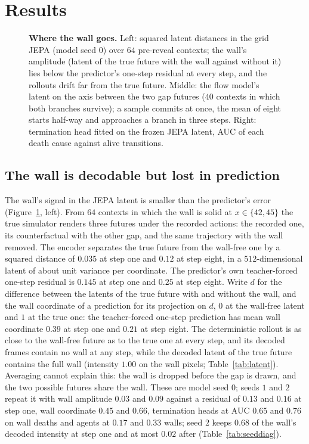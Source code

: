 \section{Results}
\label{sec:results}

\begin{figure}[t]
\centering
{}
\caption{\textbf{Where the wall goes.} Left: squared latent distances in the grid JEPA (model seed $0$) over $64$ pre-reveal contexts; the wall's amplitude (latent of the true future with the wall against without it)
lies below the predictor's one-step residual at every step, and the rollouts drift far from the true
future. Middle: the flow model's latent on the axis between the two gap futures ($40$ contexts in which both branches survive); a sample commits at once, the mean of eight starts half-way and approaches a branch in three steps. Right: termination head fitted on the frozen JEPA latent, AUC of each death cause against alive transitions.}
\label{fig:geometry}
\end{figure}

\subsection{The wall is decodable but lost in prediction}
\label{sec:results-wall}

The wall's signal in the JEPA latent is smaller than the predictor's error
(Figure~\ref{fig:geometry}, left). From $64$ contexts in which the wall is solid at $x\in\{42,45\}$ the
true simulator renders three futures under the recorded actions: the recorded one, its counterfactual
with the other gap, and the same trajectory with the wall removed. The encoder separates
the true future from the wall-free one by a squared distance of $0.035$ at step one and $0.12$ at
step eight, in a $512$-dimensional latent of about unit variance per coordinate. The predictor's own teacher-forced one-step residual is
$0.145$ at step one and $0.25$ at step eight. Write $d$ for the difference between the latents of the
true future with and without the wall, and the wall coordinate of a prediction for its projection on
$d$, $0$ at the wall-free latent and $1$ at the true one: the teacher-forced one-step prediction has
mean wall coordinate $0.39$ at step one and $0.21$ at step eight. The deterministic rollout is as close to the
wall-free future as to the true one at every step, and its decoded frames contain no wall at any step,
while the decoded latent of the true future contains the full wall (intensity $1.00$ on the wall
pixels; Table~\ref{tab:latent}). Averaging cannot explain this: the wall is dropped before the gap is
drawn, and the two possible futures share the wall. These are model seed $0$; seeds $1$ and $2$ repeat
it with wall amplitude $0.03$ and $0.09$ against a residual of $0.13$ and $0.16$ at step one, wall
coordinate $0.45$ and $0.66$, termination heads at AUC $0.65$ and $0.76$ on wall deaths and agents at
$0.17$ and $0.33$ walls; seed $2$ keeps $0.68$ of the wall's decoded intensity at step one and at most $0.02$ after (Table~\ref{tab:seeddiag}).


